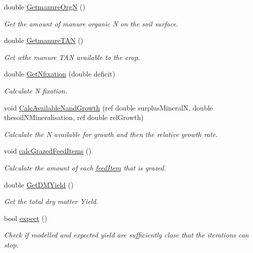 \begin{DoxyCompactItemize}
double \mbox{\hyperlink{class_crop_class_a88bcd4b2bad88a2c0269e456eef3bf59}{Getmanure\+OrgN}} ()
\begin{DoxyCompactList}\small\item\em Get the amount of manure organic N on the soil surface. \end{DoxyCompactList}\item 
double \mbox{\hyperlink{class_crop_class_af24daf4f7c4f8da19d3c40c4d008b657}{Getmanure\+T\+AN}} ()
\begin{DoxyCompactList}\small\item\em Get wthe manure T\+AN available to the crop. \end{DoxyCompactList}\item 
double \mbox{\hyperlink{class_crop_class_acc491b6f718ea6965eeb1a93228176b3}{Get\+Nfixation}} (double deficit)
\begin{DoxyCompactList}\small\item\em Calculate N fixation. \end{DoxyCompactList}\item 
void \mbox{\hyperlink{class_crop_class_a93cd3a43b010bf87d8719cc1e45b9dd2}{Calc\+Available\+Nand\+Growth}} (ref double surplus\+MineralN, double thesoil\+N\+Mineralisation, ref double rel\+Growth)
\begin{DoxyCompactList}\small\item\em Calculate the N available for growth and then the relative growth rate. \end{DoxyCompactList}\item 
\mbox{\label{class_crop_class_a5f689b2dad39470858a9c30c179f9f86}} 
void \mbox{\hyperlink{class_crop_class_a5f689b2dad39470858a9c30c179f9f86}{calc\+Grazed\+Feed\+Items}} ()
\begin{DoxyCompactList}\small\item\em Calculate the amount of each \mbox{\hyperlink{classfeed_item}{feed\+Item}} that is grazed. \end{DoxyCompactList}\item 
double \mbox{\hyperlink{class_crop_class_a0daa0a0fed32eadc489bded6932a3d95}{Get\+D\+M\+Yield}} ()
\begin{DoxyCompactList}\small\item\em Get the total dry matter Yield. \end{DoxyCompactList}\item 
bool \mbox{\hyperlink{class_crop_class_a66d5088950904f3c70f57202f27ceead}{expect}} ()
\begin{DoxyCompactList}\small\item\em Check if modelled and expected yield are sufficiently close that the iterations can stop. \end{DoxyCompactList}\item 

\end{DoxyCompactItemize}
